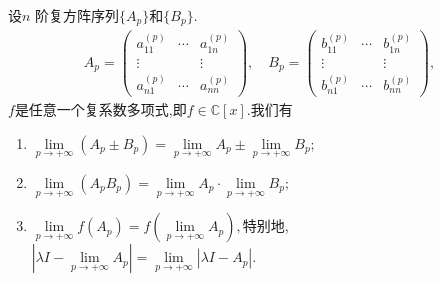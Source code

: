 \documentclass[../../main.tex]{subfiles}%
\begin{document}
\begin{theorem}[复矩阵极限的性质]\label{theorem:复矩阵极限的性质}
设$n$ 阶复方阵序列$\{A_p\}$和$\{B_p\}$.
\begin{align*}
A_p = \begin{pmatrix}
a_{11}^{(p)} & \cdots & a_{1n}^{(p)} \\
\vdots & & \vdots \\
a_{n1}^{(p)} & \cdots & a_{nn}^{(p)}
\end{pmatrix},\quad B_p = \begin{pmatrix}
b_{11}^{(p)} & \cdots & b_{1n}^{(p)} \\
\vdots & & \vdots \\
b_{n1}^{(p)} & \cdots & b_{nn}^{(p)}
\end{pmatrix},
\end{align*}
$f$是任意一个复系数多项式,即$f\in \mathbb{C}[x]$.我们有
\begin{enumerate}[(1)]
\item $\underset{p\rightarrow +\infty}{\lim}\left( A_p\pm B_p \right) =\underset{p\rightarrow +\infty}{\lim}A_p\pm \underset{p\rightarrow +\infty}{\lim}B_p;$

\item $\underset{p\rightarrow +\infty}{\lim}\left( A_pB_p \right) =\underset{p\rightarrow +\infty}{\lim}A_p\cdot \underset{p\rightarrow +\infty}{\lim}B_p;$

\item $
\underset{p\rightarrow +\infty}{\lim}f\left( A_p \right) =f\left( \underset{p\rightarrow +\infty}{\lim}A_p \right) ,$特别地,$\left| \lambda I-\underset{p\rightarrow +\infty}{\lim}A_p \right|=\underset{p\rightarrow +\infty}{\lim}\left| \lambda I-A_p \right|.$
\end{enumerate}
\end{theorem}
\end{document}
